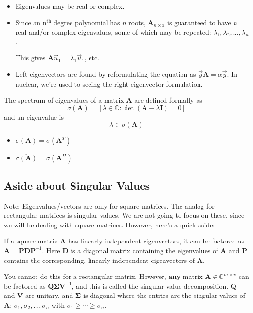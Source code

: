\documentclass[12pt]{article}
\newcommand{\nth}{n\ensuremath{^{\text{th}}} }
\newcommand{\ve}[1]{\ensuremath{\mathbf{#1}}}
\newcommand{\cc}[1]{\ensuremath{\overline{#1}}}
\begin{document}
\begin{itemize}
\item Eigenvalues may be real or complex. 

\item Since an \nth degree polynomial has $n$ roots, $\ve{A}_{n \times n}$ is guaranteed to have $n$ real and/or complex eigenvalues, some of which may be repeated: $\lambda_1, \lambda_2, \dots, \lambda_n$.

This gives $\ve{A}\vec{u}_1 = \lambda_1 \vec{u}_1$, etc.

\item Left eigenvectors are found by reformulating the equation as $\vec{y}\ve{A} = \alpha \vec{y}$. In nuclear, we're used to seeing the right eigenvector formulation.
\end{itemize}


The spectrum of eigenvalues of a matrix $\ve{A}$ are defined formally as
\[\sigma(\ve{A}) = [ \lambda \in \mathbb{C} : \det(\ve{A} - \lambda \ve{I})=0] \] 
and an eigenvalue is 
\[ \lambda \in \sigma(\ve{A}) \]
%
\begin{itemize}
\item $\sigma(\ve{A}) = \sigma(\ve{A}^T)$
\item $\cc{\sigma(\ve{A})} = \sigma(\ve{A}^H)$
\end{itemize}

\subsection{Aside about Singular Values}

\underline{Note:} Eigenvalues/vectors are only for square matrices. The analog for rectangular matrices is singular values. We are not going to focus on these, since we will be dealing with square matrices. However, here's a quick aside:

If a square matrix $\ve{A}$ has linearly independent eigenvectors, it can be factored as $\ve{A} = \ve{P}\ve{D}\ve{P}^{-1}$. Here $\ve{D}$ is a diagonal matrix containing the eigenvalues of $\ve{A}$ and $\ve{P}$ contains the corresponding, linearly independent eigenvectors of $\ve{A}$.  

You cannot do this for a rectangular matrix. However, \textbf{any} matrix $\ve{A} \in \mathbb{C}^{m \times n}$ can be factored as $\ve{Q}\ve{\Sigma}\ve{V}^{-1}$, and this is called the singular value decomposition. $\ve{Q}$ and $\ve{V}$ are unitary, and $\ve{\Sigma}$ is diagonal where the entries are the singular values of $\ve{A}$: $\sigma_1, \sigma_2, \dots, \sigma_n$ with $\sigma_1 \geq \cdots \geq \sigma_n$. 
\end{document}
